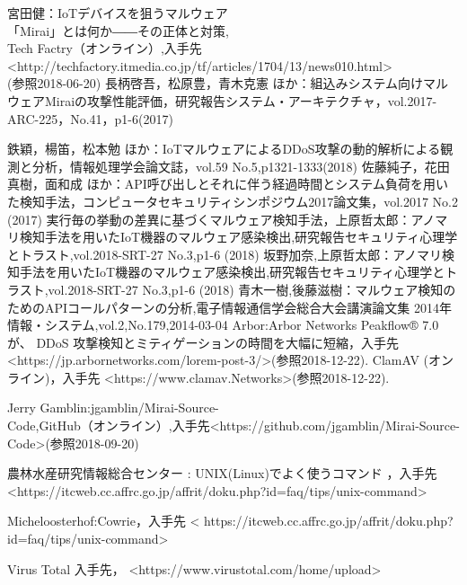 \begin{thebibliography}{30}
        宮田健：IoTデバイスを狙うマルウェア\\「Mirai」とは何か――その正体と対策,\\Tech Factry（オンライン）,入手先\textless http:\slash\slash{}techfactory.itmedia.co.jp\slash{}tf\slash{}articles\slash{}1704\slash{}13\slash{}news010.html\textgreater\\(参照2018-06-20)
        長柄啓吾，松原豊，青木克憲 ほか：組込みシステム向けマルウェアMiraiの攻撃性能評価，研究報告システム・アーキテクチャ，vol.2017-ARC-225，No.41，p1-6(2017)
    
        鉄穎，楊笛，松本勉 ほか：IoTマルウェアによるDDoS攻撃の動的解析による観測と分析，情報処理学会論文誌，vol.59 No.5,p1321-1333(2018)
        佐藤純子，花田真樹，面和成 ほか：API呼び出しとそれに伴う経過時間とシステム負荷を用いた検知手法，コンピュータセキュリティシンポジウム2017論文集，vol.2017 No.2 (2017)
        実行毎の挙動の差異に基づくマルウェア検知手法，上原哲太郎：アノマリ検知手法を用いたIoT機器のマルウェア感染検出,研究報告セキュリティ心理学とトラスト,vol.2018-SRT-27 No.3,p1-6 (2018)
        坂野加奈,上原哲太郎：アノマリ検知手法を用いたIoT機器のマルウェア感染検出,研究報告セキュリティ心理学とトラスト,vol.2018-SRT-27 No.3,p1-6 (2018)
         青木一樹,後藤滋樹：マルウェア検知のためのAPIコールパターンの分析,電子情報通信学会総合大会講演論文集 2014年 情報・システム,vol.2,No.179,2014-03-04
         Arbor:Arbor Networks Peakflow® 7.0 が、 DDoS 攻撃検知とミティゲーションの時間を大幅に短縮，入手先 \textless https:\slash\slash{}jp.arbornetworks.com\slash{}lorem-post-3\slash{}\textgreater (参照2018-12-22).
         ClamAV (オンライン)，入手先 \textless https:\slash\slash{}www.clamav.Networks\textgreater(参照2018-12-22).

     Jerry Gamblin:jgamblin/Mirai-Source-\\Code,GitHub（オンライン）,入手先\textless https://github.com/jgamblin/Mirai-Source-Code\textgreater(参照2018-09-20)
 
    
    農林水産研究情報総合センター : UNIX(Linux)でよく使うコマンド ，入手先 \textless https:\slash\slash{}itcweb.cc.affrc.go.jp\slash{}affrit/doku.php?id=faq\slash{}tips\slash{}unix-command\textgreater 
    
    Micheloosterhof:Cowrie，入手先 \textless 
    https:\slash\slash{}itcweb.cc.affrc.go.jp\slash{}affrit\slash{}doku.php?id=faq\slash{}tips/unix-command\textgreater
    
    Virus Total 入手先，
    \textless https:\slash\slash{}www.virustotal.com\slash{}home\slash{}upload\textgreater
\end{thebibliography}
